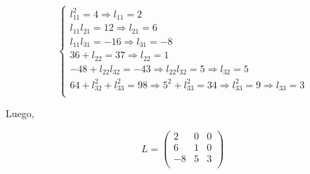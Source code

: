 $$ 
	\begin{cases}
		l_{11}^{2} = 4 \Rightarrow l_{11} = 2\\
		l_{11}l_{21} = 12 \Rightarrow l_{21} = 6\\
		l_{11}l_{31} = -16 \Rightarrow l_{31} = -8\\
		36 + l_{22} = 37 \Rightarrow l_{22} = 1\\
		-48 + l_{22}l_{32} = -43 \Rightarrow l_{22}l_{32} = 5 \Rightarrow l_{32} = 5\\
		64 + l_{32}^{2} + l_{33}^{2} = 98 \Rightarrow 5^{2} + l_{33}^{2} = 34 \Rightarrow l_{33}^{2} = 9 \Rightarrow l_{33} = 3\\
    \end{cases}
$$

Luego,

$$L =
	\begin{pmatrix}
        2 & 0 & 0\\
        6 & 1 & 0\\
        -8 & 5 & 3\\
	\end{pmatrix}
$$